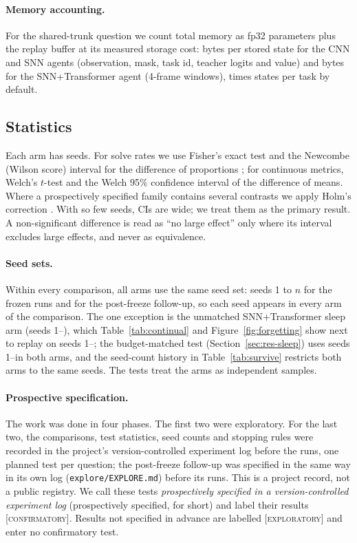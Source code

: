 \documentclass[10pt]{article}
\newcommand{\conf}{\textsc{[confirmatory]}\xspace}
\newcommand{\expl}{\textsc{[exploratory]}\xspace}
\begin{document}
\paragraph{Memory accounting.} For the shared-trunk question we count total memory as fp32 parameters plus the
replay buffer at its measured storage cost: \bytesPerState bytes per stored state for the CNN and SNN agents
(observation, mask, task id, teacher logits and value) and \bytesPerStateHybrid bytes for the SNN+Transformer agent
(4-frame windows), times \bufferPerTask states per task by default.

\subsection{Statistics}
\label{sec:stats}
Each arm has \seedRange seeds. For solve rates we use Fisher's exact test and the Newcombe (Wilson score) interval for the
difference of proportions \citep{newcombe1998interval}; for continuous metrics, Welch's $t$-test
\citep{welch1947generalization} and the Welch 95\% confidence interval of the difference of means. Where a
prospectively specified family contains several contrasts we apply Holm's correction \citep{holm1979simple}. With so
few seeds, CIs are wide; we treat them as the primary result. A non-significant difference is read as ``no large
effect'' only where its interval excludes large effects, and never as equivalence.

\paragraph{Seed sets.} Within every comparison, all arms use the same seed set: seeds 1 to $n$ for the frozen runs and
\postSeeds for the post-freeze follow-up, so each seed appears in every arm of the comparison. The one exception is the
unmatched SNN+Transformer sleep arm (seeds 1--\nHybSleep), which Table~\ref{tab:continual} and
Figure~\ref{fig:forgetting} show next to replay on seeds 1--\nHybReplay; the budget-matched test
(Section~\ref{sec:res-sleep}) uses seeds 1--\matchN in both arms, and the seed-count history in
Table~\ref{tab:survive} restricts both arms to the same seeds. The tests treat the arms as independent samples.

\paragraph{Prospective specification.} The work was done in four phases. The first two were exploratory. For the last
two, the comparisons, test statistics, seed counts and stopping rules were recorded in the project's
version-controlled experiment log before the runs, one planned test per question; the post-freeze follow-up was
specified in the same way in its own log (\texttt{explore/EXPLORE.md}) before its runs. This is a project record, not
a public registry. We call these tests \emph{prospectively specified in a version-controlled experiment log}
(prospectively specified, for short) and label their results \conf. Results not specified in advance are labelled
\expl and enter no confirmatory test.
\end{document}

